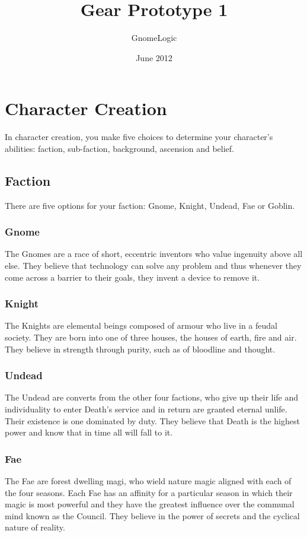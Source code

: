 \documentclass{report}
\begin{document}
\title{Gear Prototype 1}
\author{GnomeLogic}
\date{June 2012}
\maketitle

\chapter{Character Creation}
In character creation, you make five choices to determine your character's abilities: faction, sub-faction, background,
ascension and belief.

\section{Faction}
There are five options for your faction: Gnome, Knight, Undead, Fae or Goblin.

\subsection{Gnome}
The Gnomes are a race of short, eccentric inventors who value ingenuity above all else. They believe that technology can
solve any problem and thus whenever they come across a barrier to their goals, they invent a device to remove it.

\subsection{Knight}
The Knights are elemental beings composed of armour who live in a feudal society. They are born into one of three houses,
the houses of earth, fire and air. They believe in strength through purity, such as of bloodline and thought.

\subsection{Undead}
The Undead are converts from the other four factions, who give up their life and individuality to enter Death's service and
in return are granted eternal unlife. Their existence is one dominated by duty. They believe that Death is the highest
power and know that in time all will fall to it.

\subsection{Fae}
The Fae are forest dwelling magi, who wield nature magic aligned with each of the four seasons. Each Fae has an affinity
for a particular season in which their magic is most powerful and they have the greatest influence over the communal mind
known as the Council. They believe in the power of secrets and the cyclical nature of reality.
\end{document}
